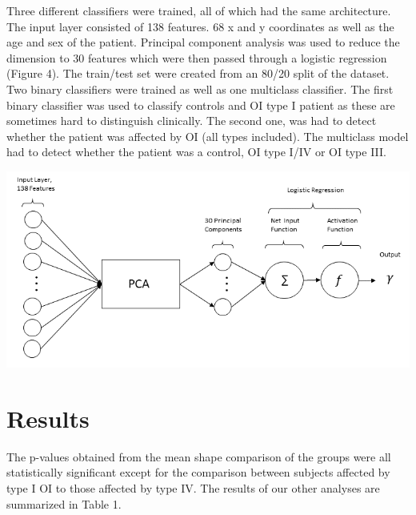 \documentclass{article}
\begin{document}
\begin{multicols}{2}
Three different classifiers were trained, all of which had the same
architecture. The input layer consisted of 138 features. 68 x and y
coordinates as well as the age and sex of the patient. Principal
component analysis was used to reduce the dimension to 30 features which
were then passed through a logistic regression (Figure 4). The
train/test set were created from an 80/20 split of the dataset. Two
binary classifiers were trained as well as one multiclass classifier.
The first binary classifier was used to classify controls and OI type I
patient as these are sometimes hard to distinguish clinically. The
second one, was had to detect whether the patient was affected by OI
(all types included). The multiclass model had to detect whether the
patient was a control, OI type I/IV or OI type III.


\begin{center}
\includegraphics[width=\linewidth]{figures/regression.png}
\end{center}

\section{Results}

The p-values obtained from the mean shape comparison of the groups were
all statistically significant except for the comparison between subjects
affected by type I OI to those affected by type IV. The results of our
other analyses are summarized in Table 1.


\end{multicols}
\end{document}
